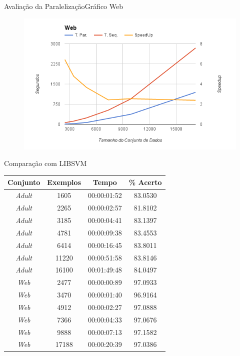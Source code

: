 \documentclass{beamer}
\begin{document}
\begin{frame}{Avaliação da Paralelização}{Gráfico Web}
\begin{figure}
  \centering
  \includegraphics[width=1\textwidth]{GraficoWeb.png}
\end{figure}
\end{frame}

\begin{frame}{Comparação com LIBSVM}
    \begin{table}
    \small
    \centering
    \begin{tabular}{|c|c|c|c|} \hline
        Conjunto & Exemplos & Tempo & \% Acerto \\ \hline
        \em{Adult} & 1605 & 00:00:01:52 & 83.0530 \\ \hline
        \em{Adult} & 2265 &  00:00:02:57 & 81.8102 \\ \hline
        \em{Adult} & 3185 &  00:00:04:41 & 83.1397 \\ \hline
        \em{Adult} & 4781 & 00:00:09:38 & 83.4553 \\ \hline
        \em{Adult} & 6414 & 00:00:16:45 & 83.8011 \\ \hline
        \em{Adult} & 11220 & 00:00:51:58 & 83.8146 \\ \hline
        \em{Adult} & 16100 & 00:01:49:48 & 84.0497 \\ \hline
        \em{Web} & 2477 & 00:00:00:89 & 97.0933 \\ \hline
        \em{Web} & 3470 & 00:00:01:40 & 96.9164 \\ \hline
        \em{Web} & 4912 & 00:00:02:27 & 97.0888 \\ \hline
        \em{Web} & 7366 & 00:00:04:33 & 97.0676 \\ \hline
        \em{Web} & 9888 & 00:00:07:13 & 97.1582 \\ \hline
        \em{Web} & 17188 & 00:00:20:39 & 97.0386 \\ \hline
    \end{tabular}
\end{table}
\end{frame}
\end{document}
